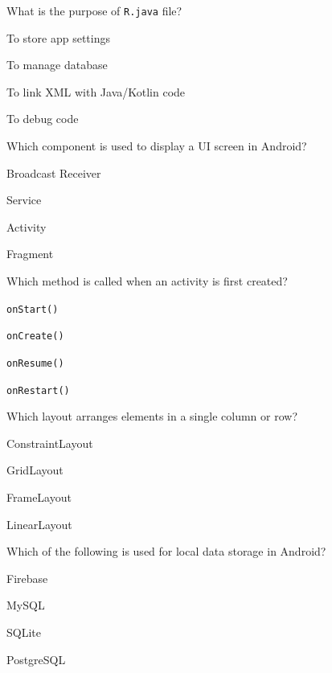 \documentclass[11pt,a4paper]{article}
\begin{document}
\begin{parts}
  \item What is the purpose of   \texttt{R.java} file?
    
\begin{parts}
      \item To store app settings
      \item To manage database
      \item To link XML with Java/Kotlin code
      \item To debug code
    \end{parts}

  \item Which component is used to display a UI screen in Android?
    
\begin{parts}
      \item Broadcast Receiver
      \item Service
      \item Activity
      \item Fragment
    \end{parts}

  \item Which method is called when an activity is first created?
    
\begin{parts}
      \item   \texttt{onStart()}
      \item   \texttt{onCreate()}
      \item   \texttt{onResume()}
      \item   \texttt{onRestart()}
    \end{parts}

  \item Which layout arranges elements in a single column or row?
    
\begin{parts}
      \item ConstraintLayout
      \item GridLayout
      \item FrameLayout
      \item LinearLayout
    \end{parts}

  \item Which of the following is used for local data storage in Android?
    
\begin{parts}
      \item Firebase
      \item MySQL
      \item SQLite
      \item PostgreSQL
    \end{parts}
\end{parts}
\end{document}
